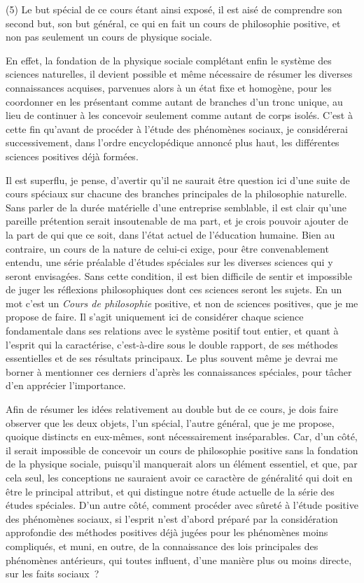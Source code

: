 \documentclass[french,twoside]{book} %
\begin{document}
(5) Le but spécial de ce cours étant ainsi exposé, il est aisé de comprendre son second but, son but général, ce qui en fait un cours de philosophie positive, et non pas seulement un cours de physique sociale.\par
En effet, la fondation de la physique sociale complétant enfin le système des sciences naturelles, il devient possible et même nécessaire de résumer les diverses connaissances acquises, parvenues alors à un état fixe et homogène, pour les coordonner en les présentant comme autant de branches d’un tronc unique, au lieu de continuer à les concevoir seulement comme autant de corps isolés. C’est à cette fin qu’avant de procéder à l’étude des phénomènes sociaux, je considérerai successivement, dans l’ordre encyclopédique annoncé plus haut, les différentes sciences positives déjà formées.\par
Il est superflu, je pense, d’avertir qu’il ne saurait être question ici d’une suite de cours spéciaux sur chacune des branches principales de la philosophie naturelle. Sans parler de la durée matérielle d’une entreprise semblable, il est clair qu’une pareille prétention serait insoutenable de ma part, et je crois pouvoir ajouter de la part de qui que ce soit, dans l’état actuel de l’éducation humaine. Bien au contraire, un cours de la nature de celui-ci exige, pour être convenablement entendu, une série préalable d’études spéciales sur les diverses sciences qui y seront envisagées. Sans cette condition, il est bien difficile de sentir et impossible de juger les réflexions philosophiques dont ces sciences seront les sujets. En un mot c’est un {\itshape Cours de philosophie} positive, et non de sciences positives, que je me propose de faire. Il s’agit uniquement ici de considérer chaque science fondamentale dans ses relations avec le système positif tout entier, et quant à l’esprit qui la caractérise, c’est-à-dire sous le double rapport, de ses méthodes essentielles et de ses résultats principaux. Le plus souvent même je devrai me borner à mentionner ces derniers d’après les connaissances spéciales, pour tâcher d’en apprécier l’importance.\par
Afin de résumer les idées relativement au double but de ce cours, je dois faire observer que les deux objets, l’un spécial, l’autre général, que je me propose, quoique distincts en eux-mêmes, sont nécessairement inséparables. Car, d’un côté, il serait impossible de concevoir un cours de philosophie positive sans la fondation de la physique sociale, puisqu’il manquerait alors un élément essentiel, et que, par cela seul, les conceptions ne sauraient avoir ce caractère de généralité qui doit en être le principal attribut, et qui distingue notre étude actuelle de la série des études spéciales. D’un autre côté, comment procéder avec sûreté à l’étude positive des phénomènes sociaux, si l’esprit n’est d’abord préparé par la considération approfondie des méthodes positives déjà jugées pour les phénomènes moins compliqués, et muni, en outre, de la connaissance des lois principales des phénomènes antérieurs, qui toutes influent, d’une manière plus ou moins directe, sur les faits sociaux ?\par
\end{document}
